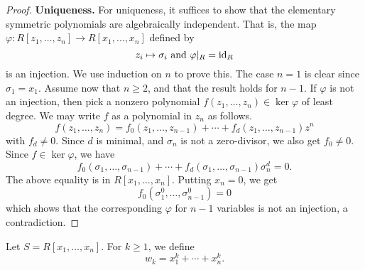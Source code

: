 \begin{proof}
    \textbf{Uniqueness.} For uniqueness, it suffices to show that the elementary symmetric polynomials are algebraically independent. That is, the map $\varphi \colon R[z_1, \ldots, z_n] \to R[x_1, \ldots, x_n]$ defined by
    \[
        z_i \mapsto \sigma_i \text{ and } \varphi|_{R} = \operatorname{id}_R
    \]
    is an injection. We use induction on $n$ to prove this. The case $n=1$ is clear since $\sigma_1 = x_1$. Assume now that $n \geq 2$, and that the result holds for $n-1$. If $\varphi$ is not an injection, then pick a nonzero polynomial $f(z_1, \ldots, z_n) \in \ker\varphi$ of least degree. We may write $f$ as a polynomial in $z_n$ as follows. 
    \[
        f(z_1, \ldots, z_n) = f_0(z_1, \ldots, z_{n-1}) + \cdots + f_d(z_1, \ldots, z_{n-1})z^n
    \]
    with $f_d \neq 0$. Since $d$ is minimal, and $\sigma_n$ is not a zero-divisor, we also get $f_0 \neq 0$. Since $f \in \ker\varphi$, we have
    \[
        f_0(\sigma_1, \ldots, \sigma_{n-1}) + \cdots + f_d(\sigma_1, \ldots, \sigma_{n-1}) \sigma_n^d = 0.
    \]
    The above equality is in $R[x_1, \ldots, x_n]$. Putting $x_n = 0$, we get
    \[
        f_0(\sigma_1^0, \ldots, \sigma^0_{n-1}) = 0
    \]
    which shows that the corresponding $\varphi$ for $n-1$ variables is not an injection, a contradiction.
\end{proof}

\begin{defn}
    Let $S = R[x_1, \ldots, x_n]$. For $k \geq 1$, we define
    \[
        w_k = x_1^k + \cdots + x_n^k.
    \]
\end{defn}

